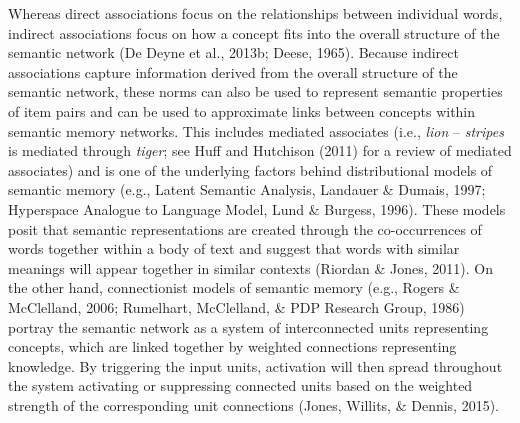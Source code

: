\documentclass[english,,man]{apa6}
\begin{document}
Whereas direct associations focus on the relationships between individual words, indirect associations focus on how a concept fits into the overall structure of the semantic network (De Deyne et al., 2013b; Deese, 1965). Because indirect associations capture information derived from the overall structure of the semantic network, these norms can also be used to represent semantic properties of item pairs and can be used to approximate links between concepts within semantic memory networks. This includes mediated associates (i.e., \emph{lion} -- \emph{stripes} is mediated through \emph{tiger}; see Huff and Hutchison (2011) for a review of mediated associates) and is one of the underlying factors behind distributional models of semantic memory (e.g., Latent Semantic Analysis, Landauer \& Dumais, 1997; Hyperspace Analogue to Language Model, Lund \& Burgess, 1996). These models posit that semantic representations are created through the co-occurrences of words together within a body of text and suggest that words with similar meanings will appear together in similar contexts (Riordan \& Jones, 2011). On the other hand, connectionist models of semantic memory (e.g., Rogers \& McClelland, 2006; Rumelhart, McClelland, \& PDP Research Group, 1986) portray the semantic network as a system of interconnected units representing concepts, which are linked together by weighted connections representing knowledge. By triggering the input units, activation will then spread throughout the system activating or suppressing connected units based on the weighted strength of the corresponding unit connections (Jones, Willits, \& Dennis, 2015).
\end{document}
